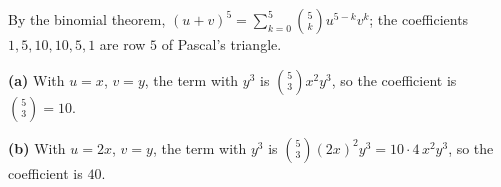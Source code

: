 By the binomial theorem, $(u+v)^5=\sum_{k=0}^{5}\binom5k u^{5-k}v^k$; the coefficients $1,5,10,10,5,1$ are row $5$ of Pascal's triangle.

\textbf{(a)} With $u=x$, $v=y$, the term with $y^3$ is $\binom53x^2y^3$, so the coefficient is $\binom53=\boxed{10}$.

\textbf{(b)} With $u=2x$, $v=y$, the term with $y^3$ is $\binom53(2x)^2y^3=10\cdot4\,x^2y^3$, so the coefficient is $\boxed{40}$.
